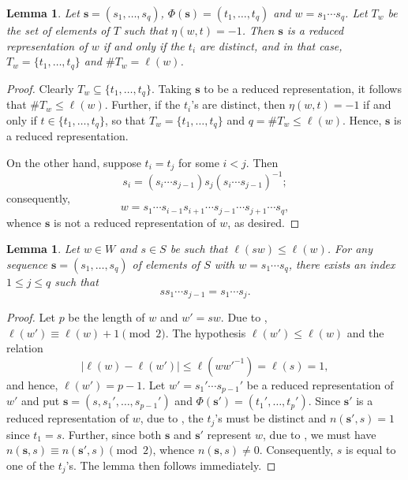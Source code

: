 \documentclass{article}
\theoremstyle{thmstyle}
\newtheorem{lemma}[theorem]{Lemma}
\theoremstyle{defstyle}
\renewcommand{\le}{\leqslant}
\begin{document}
\begin{lemma}
    Let $\mathbf{s} = (s_1,\dots,s_q)$, $\Phi(\mathbf{s}) = (t_1,\dots,t_q)$ and $w = s_1\cdots s_q$. Let $T_w$ be the set of elements of $T$ such that $\eta(w, t) = -1$. Then $\mathbf{s}$ is a reduced representation of $w$ if and only if the $t_i$ are distinct, and in that case, $T_w = \{t_1,\dots,t_q\}$ and $\# T_w = \ell(w)$.
\end{lemma}
\begin{proof}
    Clearly $T_w\subseteq\{t_1,\dots,t_q\}$. Taking $\mathbf s$ to be a reduced representation, it follows that $\# T_w\le\ell(w)$. Further, if the $t_i$'s are distinct, then $\eta(w, t) = -1$ if and only if $t\in\{t_1,\dots,t_q\}$, so that $T_w = \{t_1,\dots, t_q\}$ and $q = \# T_w\le\ell(w)$. Hence, $\mathbf s$ is a reduced representation.

    On the other hand, suppose $t_i = t_j$ for some $i < j$. Then 
    \begin{equation*}
        s_i = (s_i\cdots s_{j - 1}) s_j(s_i\cdots s_{j - 1})^{-1};
    \end{equation*}
    consequently, 
    \begin{equation*}
        w = s_1\cdots s_{i - 1} s_{i + 1}\cdots s_{j - 1}\cdots s_{j + 1}\cdots s_q,
    \end{equation*}
    whence $\mathbf s$ is not a reduced representation of $w$, as desired.
\end{proof}

\begin{lemma}
    Let $w\in W$ and $s\in S$ be such that $\ell(sw)\le \ell(w)$. For any sequence $\mathbf s = (s_1,\dots,s_q)$ of elements of $S$ with $w = s_1\cdots s_q$, there exists an index $1\le j\le q$ such that 
    \begin{equation*}
        ss_1\cdots s_{j - 1} = s_1\cdots s_j.
    \end{equation*}
\end{lemma}
\begin{proof}
    Let $p$ be the length of $w$ and $w'= sw$. Due to , $\ell(w')\equiv\ell(w) + 1\pmod 2$. The hypothesis $\ell(w')\le\ell(w)$ and the relation
    \begin{equation*}
        \left|\ell(w) - \ell(w')\right|\le\ell(ww'^{-1}) = \ell(s) = 1,
    \end{equation*}
    and hence, $\ell(w') = p - 1$. Let $w' = s_1'\cdots s_{p - 1}'$ be a reduced representation of $w'$ and put $\mathbf s = (s, s_1',\dots,s_{p - 1}')$ and $\Phi(\mathbf s') = (t_1',\dots,t_p')$. Since $\mathbf s'$ is a reduced representation of $w$, due to , the $t_j$'s must be distinct and $n(\mathbf s', s) = 1$ since $t_1 = s$. Further, since both $\mathbf s$ and $\mathbf s'$ represent $w$, due to , we must have $n(\mathbf s, s)\equiv n(\mathbf s', s)\pmod 2$, whence $n(\mathbf s, s)\ne 0$. Consequently, $s$ is equal to one of the $t_j$'s. The lemma then follows immediately.
\end{proof}
\end{document}

